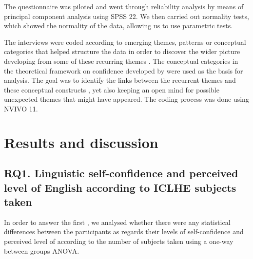 \documentclass[output=paper]{langsci/langscibook}
\begin{document}
The questionnaire was piloted and went through reliability analysis by means of principal component analysis using SPSS 22. We then carried out normality tests, which showed the normality of the data, allowing us to use parametric tests. 



The interviews were coded according to emerging themes, patterns or conceptual categories that helped structure the data in order to discover the wider picture developing from some of these recurring themes \citep{Saldaña2013}. The conceptual categories in the  theoretical framework on  confidence  developed by \citet{SampasivamClément2014} were used as the basis for  analysis. The goal was to identify the links between the recurrent themes and these conceptual constructs \citep{Pavlenko2007}, yet also keeping an open mind for possible unexpected themes that might have appeared. The coding process was done using NVIVO 11.


\section{Results and discussion}


\subsection{RQ1. Linguistic self-confidence and perceived level of English according to ICLHE subjects taken}

In order to answer the first , we analysed whether there were any statistical differences between the participants as regards their levels of  self-confidence and perceived level of  according to the number of  subjects taken using a one-way between groups ANOVA. 
\end{document}
